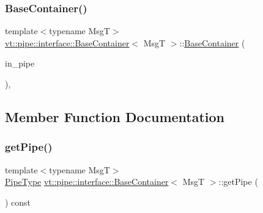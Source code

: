 \subsubsection{\texorpdfstring{Base\+Container()}{BaseContainer()}}
{\footnotesize\ttfamily template$<$typename MsgT$>$ \\
\hyperlink{structvt_1_1pipe_1_1interface_1_1_base_container}{vt\+::pipe\+::interface\+::\+Base\+Container}$<$ MsgT $>$\+::\hyperlink{structvt_1_1pipe_1_1interface_1_1_base_container}{Base\+Container} (\begin{DoxyParamCaption}\item[{\hyperlink{namespacevt_ac9852acda74d1896f48f406cd72c7bd3}{Pipe\+Type} const \&}]{in\+\_\+pipe }\end{DoxyParamCaption})\hspace{0.3cm}{\ttfamily [inline]}, {\ttfamily [explicit]}}



\subsection{Member Function Documentation}
\mbox{\label{structvt_1_1pipe_1_1interface_1_1_base_container_a5301aebfd709a96a3de5e03218c9300f}} 
\subsubsection{\texorpdfstring{get\+Pipe()}{getPipe()}}
{\footnotesize\ttfamily template$<$typename MsgT$>$ \\
\hyperlink{namespacevt_ac9852acda74d1896f48f406cd72c7bd3}{Pipe\+Type} \hyperlink{structvt_1_1pipe_1_1interface_1_1_base_container}{vt\+::pipe\+::interface\+::\+Base\+Container}$<$ MsgT $>$\+::get\+Pipe (\begin{DoxyParamCaption}{ }\end{DoxyParamCaption}) const\hspace{0.3cm}{\ttfamily [inline]}}

\mbox{\label{structvt_1_1pipe_1_1interface_1_1_base_container_af042ddd27d8c1d683af861e2d12e0940}} 
